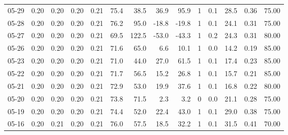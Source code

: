 \begin{threeparttable}
{\begin{tabular}{lrrrrrrrrrrrrr}
  05-29 &          0.20 &          0.20 &          0.20 &        0.21 &                75.4 &                38.5 &       36.9 &         95.9 &              1 &                 0.1 &             28.5 &            0.36 &                  75.00 \\
  05-28 &          0.20 &          0.20 &          0.20 &        0.21 &                76.2 &                95.0 &      -18.8 &        -19.8 &              1 &                 0.1 &             24.1 &            0.31 &                  75.00 \\
  05-27 &          0.20 &          0.20 &          0.20 &        0.21 &                69.5 &               122.5 &      -53.0 &        -43.3 &              1 &                 0.2 &             24.3 &            0.31 &                  80.00 \\
  05-26 &          0.20 &          0.20 &          0.20 &        0.21 &                71.6 &                65.0 &        6.6 &         10.1 &              1 &                 0.0 &             14.2 &            0.19 &                  85.00 \\
  05-23 &          0.20 &          0.20 &          0.20 &        0.21 &                71.0 &                44.0 &       27.0 &         61.5 &              1 &                 0.1 &             17.4 &            0.23 &                  85.00 \\
  05-22 &          0.20 &          0.20 &          0.20 &        0.21 &                71.7 &                56.5 &       15.2 &         26.8 &              1 &                 0.1 &             15.7 &            0.21 &                  85.00 \\
  05-21 &          0.20 &          0.20 &          0.20 &        0.21 &                72.9 &                53.0 &       19.9 &         37.6 &              1 &                 0.1 &             16.8 &            0.22 &                  80.00 \\
  05-20 &          0.20 &          0.20 &          0.20 &        0.21 &                73.8 &                71.5 &        2.3 &          3.2 &              0 &                 0.0 &             21.1 &            0.28 &                  75.00 \\
  05-19 &          0.20 &          0.20 &          0.20 &        0.21 &                74.4 &                52.0 &       22.4 &         43.0 &              1 &                 0.1 &             29.0 &            0.38 &                  75.00 \\
  05-16 &          0.20 &          0.21 &          0.20 &        0.21 &                76.0 &                57.5 &       18.5 &         32.2 &              1 &                 0.1 &             31.5 &            0.41 &                  70.00 \\

\end{tabular}}
\end{threeparttable}
